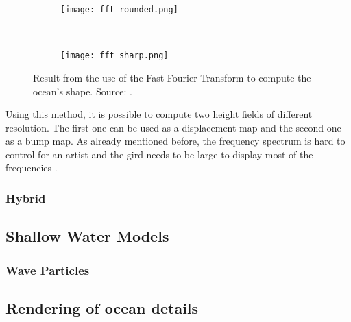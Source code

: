 \begin{figure}[h!]
    \centering
    \begin{subfigure}[h]{0.45\textwidth}
        \centering
        \texttt{[image: fft\_rounded.png]}
        \label{subfig:fft_round}
    \end{subfigure}~%
    \begin{subfigure}[h]{0.45\textwidth}
        \centering
        \texttt{[image: fft\_sharp.png]}
        \label{subfig:fft_sharp}
    \end{subfigure}
    \caption{Result from the use of the Fast Fourier Transform to compute the
    ocean's shape. Source:
    \autocite{tessendorf2001simulating}.}\label{fig:fft_comparison}
\end{figure}

Using this method, it is possible to compute two height fields of different
resolution. The first one can be used as a displacement map and the second one
as a bump map. As already mentioned before, the frequency spectrum is hard to
control for an artist and the gird needs to be large to display most of the
frequencies \autocite{gonzalez2016rendering}.


\subsubsection{Hybrid}

\subsection{Shallow Water Models}\label{subsec:shallow_water}

\subsubsection{Wave Particles}\label{subsub:wave_particles}

\subsection{Rendering of ocean details}\label{subsec:ocean_details}

